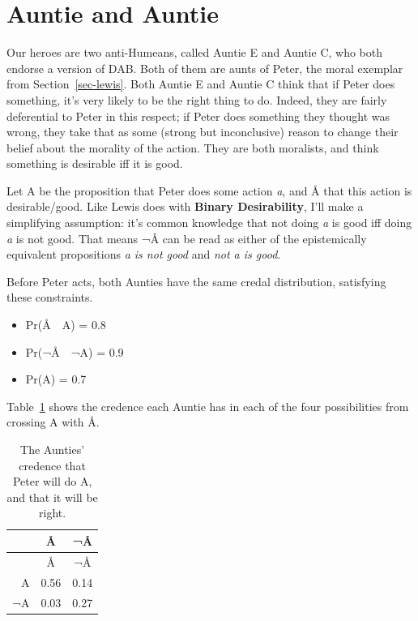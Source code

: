\documentclass[
  11pt,
  letterpaper,
  DIV=11,
  numbers=noendperiod,
  twoside]{scrartcl}
\providecommand{\tightlist}{%
  \setlength{\itemsep}{0pt}\setlength{\parskip}{0pt}}
\begin{document}
\section{Auntie and Auntie}\label{sec-auntie}

Our heroes are two anti-Humeans, called Auntie E and Auntie C, who both
endorse a version of DAB. Both of them are aunts of Peter, the moral
exemplar from Section~\ref{sec-lewis}. Both Auntie E and Auntie C think
that if Peter does something, it's very likely to be the right thing to
do. Indeed, they are fairly deferential to Peter in this respect; if
Peter does something they thought was wrong, they take that as some
(strong but inconclusive) reason to change their belief about the
morality of the action. They are both moralists, and think something is
desirable iff it is good.

Let A be the proposition that Peter does some action \emph{a}, and Å
that this action is desirable/good. Like Lewis does with \textbf{Binary
Desirability}, I'll make a simplifying assumption: it's common knowledge
that not doing \emph{a} is good iff doing \emph{a} is not good. That
means ¬Å can be read as either of the epistemically equivalent
propositions \emph{a is not good} and \emph{not a is good}.

Before Peter acts, both Aunties have the same credal distribution,
satisfying these constraints.

\begin{itemize}
\tightlist
\item
  Pr(Å~\textbar~A) = 0.8
\item
  Pr(¬Å~\textbar~¬A) = 0.9
\item
  Pr(A) = 0.7
\end{itemize}

Table~\ref{tbl-credence} shows the credence each Auntie has in each of
the four possibilities from crossing A with Å.

\begin{longtable}[]{@{}rcc@{}}
\caption{The Aunties' credence that Peter will do A, and that it will be
right.}\label{tbl-credence}\tabularnewline
\toprule\noalign{}
& Å & ¬Å \\
\midrule\noalign{}
\endfirsthead
\toprule\noalign{}
& Å & ¬Å \\
\midrule\noalign{}
\endhead
\bottomrule\noalign{}
\endlastfoot
A & 0.56 & 0.14 \\
¬A & 0.03 & 0.27 \\
\end{longtable}
\end{document}
